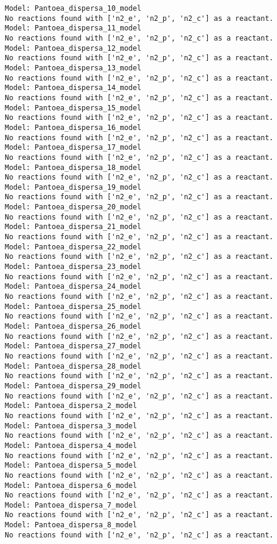 \documentclass[
  letterpaper,
  DIV=11,
  numbers=noendperiod]{scrartcl}
\begin{document}
\begin{verbatim}
Model: Pantoea_dispersa_10_model
No reactions found with ['n2_e', 'n2_p', 'n2_c'] as a reactant.
Model: Pantoea_dispersa_11_model
No reactions found with ['n2_e', 'n2_p', 'n2_c'] as a reactant.
Model: Pantoea_dispersa_12_model
No reactions found with ['n2_e', 'n2_p', 'n2_c'] as a reactant.
Model: Pantoea_dispersa_13_model
No reactions found with ['n2_e', 'n2_p', 'n2_c'] as a reactant.
Model: Pantoea_dispersa_14_model
No reactions found with ['n2_e', 'n2_p', 'n2_c'] as a reactant.
Model: Pantoea_dispersa_15_model
No reactions found with ['n2_e', 'n2_p', 'n2_c'] as a reactant.
Model: Pantoea_dispersa_16_model
No reactions found with ['n2_e', 'n2_p', 'n2_c'] as a reactant.
Model: Pantoea_dispersa_17_model
No reactions found with ['n2_e', 'n2_p', 'n2_c'] as a reactant.
Model: Pantoea_dispersa_18_model
No reactions found with ['n2_e', 'n2_p', 'n2_c'] as a reactant.
Model: Pantoea_dispersa_19_model
No reactions found with ['n2_e', 'n2_p', 'n2_c'] as a reactant.
Model: Pantoea_dispersa_20_model
No reactions found with ['n2_e', 'n2_p', 'n2_c'] as a reactant.
Model: Pantoea_dispersa_21_model
No reactions found with ['n2_e', 'n2_p', 'n2_c'] as a reactant.
Model: Pantoea_dispersa_22_model
No reactions found with ['n2_e', 'n2_p', 'n2_c'] as a reactant.
Model: Pantoea_dispersa_23_model
No reactions found with ['n2_e', 'n2_p', 'n2_c'] as a reactant.
Model: Pantoea_dispersa_24_model
No reactions found with ['n2_e', 'n2_p', 'n2_c'] as a reactant.
Model: Pantoea_dispersa_25_model
No reactions found with ['n2_e', 'n2_p', 'n2_c'] as a reactant.
Model: Pantoea_dispersa_26_model
No reactions found with ['n2_e', 'n2_p', 'n2_c'] as a reactant.
Model: Pantoea_dispersa_27_model
No reactions found with ['n2_e', 'n2_p', 'n2_c'] as a reactant.
Model: Pantoea_dispersa_28_model
No reactions found with ['n2_e', 'n2_p', 'n2_c'] as a reactant.
Model: Pantoea_dispersa_29_model
No reactions found with ['n2_e', 'n2_p', 'n2_c'] as a reactant.
Model: Pantoea_dispersa_2_model
No reactions found with ['n2_e', 'n2_p', 'n2_c'] as a reactant.
Model: Pantoea_dispersa_3_model
No reactions found with ['n2_e', 'n2_p', 'n2_c'] as a reactant.
Model: Pantoea_dispersa_4_model
No reactions found with ['n2_e', 'n2_p', 'n2_c'] as a reactant.
Model: Pantoea_dispersa_5_model
No reactions found with ['n2_e', 'n2_p', 'n2_c'] as a reactant.
Model: Pantoea_dispersa_6_model
No reactions found with ['n2_e', 'n2_p', 'n2_c'] as a reactant.
Model: Pantoea_dispersa_7_model
No reactions found with ['n2_e', 'n2_p', 'n2_c'] as a reactant.
Model: Pantoea_dispersa_8_model
No reactions found with ['n2_e', 'n2_p', 'n2_c'] as a reactant.

\end{verbatim}
\end{document}
